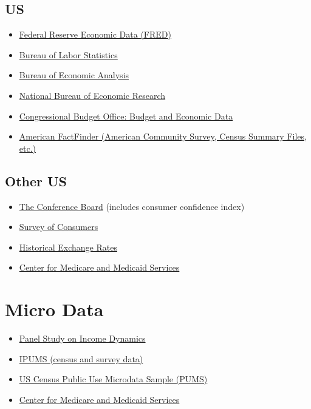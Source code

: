 \documentclass[]{book}
\providecommand{\tightlist}{%
  \setlength{\itemsep}{0pt}\setlength{\parskip}{0pt}}
\theoremstyle{definition}
\theoremstyle{definition}
\theoremstyle{remark}
\begin{document}
\subsection*{US}\label{us}

\begin{itemize}
\tightlist
\item
  \href{https://fred.stlouisfed.org/}{Federal Reserve Economic Data
  (FRED)}
\item
  \href{https://www.bls.gov/data/}{Bureau of Labor Statistics}
\item
  \href{https://www.bea.gov/data.htm}{Bureau of Economic Analysis}
\item
  \href{http://www.nber.org/data/}{National Bureau of Economic Research}
\item
  \href{https://www.cbo.gov/about/products/budget-economic-data}{Congressional
  Budget Office: Budget and Economic Data}
\item
  \href{https://factfinder.census.gov/}{American FactFinder (American
  Community Survey, Census Summary Files, etc.)}
\end{itemize}

\subsection*{Other US}\label{other-us}

\begin{itemize}
\tightlist
\item
  \href{https://www.conference-board.org/data/}{The Conference Board}
  (includes consumer confidence index)
\item
  \href{http://www.sca.isr.umich.edu/tables.html}{Survey of Consumers}
\item
  \href{https://measuringworth.com/datasets/}{Historical Exchange Rates}
\item
  \href{https://dnav.cms.gov}{Center for Medicare and Medicaid Services}
\end{itemize}

\section*{Micro Data}\label{micro-data}

\begin{itemize}
\tightlist
\item
  \href{http://simba.isr.umich.edu/data/data.aspx}{Panel Study on Income
  Dynamics}
\item
  \href{https://www.ipums.org/}{IPUMS (census and survey data)}
\item
  \href{https://www.census.gov/programs-surveys/acs/data/pums.html}{US
  Census Public Use Microdata Sample (PUMS)}
\item
  \href{https://dnav.cms.gov}{Center for Medicare and Medicaid Services}
\end{itemize}
\end{document}
